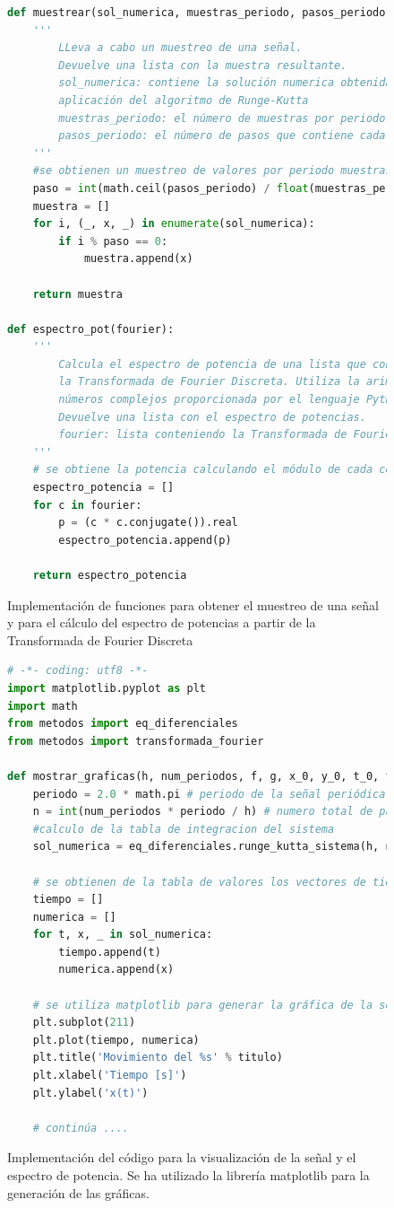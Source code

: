 \documentclass[11pt]{article}
\begin{document}
\begin{figure}
\begin{lstlisting}[language=Python]
def muestrear(sol_numerica, muestras_periodo, pasos_periodo):
	'''
		LLeva a cabo un muestreo de una señal.
		Devuelve una lista con la muestra resultante.
		sol_numerica: contiene la solución numerica obtenida de la
		aplicación del algoritmo de Runge-Kutta
		muestras_periodo: el número de muestras por periodo a obtener
		pasos_periodo: el número de pasos que contiene cada perido
	'''
	#se obtienen un muestreo de valores por periodo muestras_periodo
	paso = int(math.ceil(pasos_periodo) / float(muestras_periodo - 1))
	muestra = []
	for i, (_, x, _) in enumerate(sol_numerica):
		if i % paso == 0:
			muestra.append(x)

	return muestra

def espectro_pot(fourier):
	'''
		Calcula el espectro de potencia de una lista que contiene
		la Transformada de Fourier Discreta. Utiliza la arimética de
		números complejos proporcionada por el lenguaje Python.
		Devuelve una lista con el espectro de potencias.
		fourier: lista conteniendo la Transformada de Fourier Discreta.
	'''
	# se obtiene la potencia calculando el módulo de cada coeficiente complejo
	espectro_potencia = []
	for c in fourier:
		p = (c * c.conjugate()).real
		espectro_potencia.append(p)

	return espectro_potencia
\end{lstlisting}
\caption{Implementación de funciones para obtener el muestreo de una señal y para el cálculo del espectro de
potencias a partir de la Transformada de Fourier Discreta}
\end{figure}

\begin{figure}
\begin{lstlisting}[language=python]
# -*- coding: utf8 -*-
import matplotlib.pyplot as plt
import math
from metodos import eq_diferenciales
from metodos import transformada_fourier

def mostrar_graficas(h, num_periodos, f, g, x_0, y_0, t_0, titulo, fichero=None):
	periodo = 2.0 * math.pi # periodo de la señal periódica
	n = int(num_periodos * periodo / h) # numero total de pasos de integración
	#calculo de la tabla de integracion del sistema 
	sol_numerica = eq_diferenciales.runge_kutta_sistema(h, n, f, g, x_0, y_0, t_0)

	# se obtienen de la tabla de valores los vectores de tiempo, 
	tiempo = []
	numerica = []
	for t, x, _ in sol_numerica:
		tiempo.append(t)
		numerica.append(x)

	# se utiliza matplotlib para generar la gráfica de la señal
	plt.subplot(211)
	plt.plot(tiempo, numerica)
	plt.title('Movimiento del %s' % titulo)
	plt.xlabel('Tiempo [s]')
	plt.ylabel('x(t)')

	# continúa ....

\end{lstlisting}
\caption{Implementación del código para la visualización de la señal y el espectro de potencia.
Se ha utilizado la librería matplotlib para la generación de las gráficas.}
\end{figure}
\end{document}
